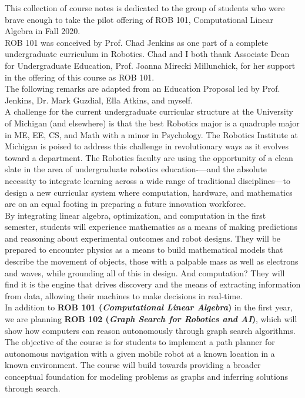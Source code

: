 
This collection of course notes is dedicated to the group of students who were brave enough to take the pilot offering of ROB 101, Computational Linear Algebra in Fall 2020. \\

ROB 101 was conceived by Prof. Chad Jenkins as one part of a complete undergraduate curriculum in Robotics. Chad and I both thank Associate Dean for Undergraduate Education, Prof. Joanna Mirecki Millunchick, for her support in the offering of this course as ROB 101. \\

The following remarks are adapted from an Education Proposal led by Prof. Jenkins, Dr. Mark Guzdial, Ella Atkins, and myself.\\


A challenge for the current undergraduate curricular structure at the University of Michigan (and elsewhere) is that the best Robotics major is a quadruple major in ME, EE, CS, and Math with a minor in Psychology. The Robotics Institute at Michigan is poised to address this challenge in revolutionary ways as it evolves toward a department. The Robotics faculty are using the opportunity of a clean slate in the area of undergraduate robotics education-—and the absolute necessity to integrate learning across a wide range of traditional disciplines---to design a new curricular system where computation, hardware, and mathematics are on an equal footing in preparing a future innovation workforce.  \\

By integrating linear algebra, optimization, and computation in the first semester, students will experience mathematics as a means of making predictions and reasoning about experimental outcomes and robot designs. They will be prepared to encounter physics as a means to build mathematical models that describe the movement of objects, those with a palpable mass as well as electrons and waves, while grounding all of this in design. And computation? They will find it is the engine that drives discovery and the means of extracting information from data, allowing their machines to make decisions in real-time.\\

In addition to \textbf{ROB 101 ({\em Computational Linear Algebra})} in the first year, we are planning \textbf{ROB 102 ({\em Graph Search for Robotics and AI})}, which will show how computers can reason autonomously through graph search algorithms. The objective of the course is for students to implement a path planner for autonomous navigation with a given mobile robot at a known location in a known environment.  The course will build towards providing a broader conceptual foundation for modeling problems as graphs and inferring solutions through search. \\

